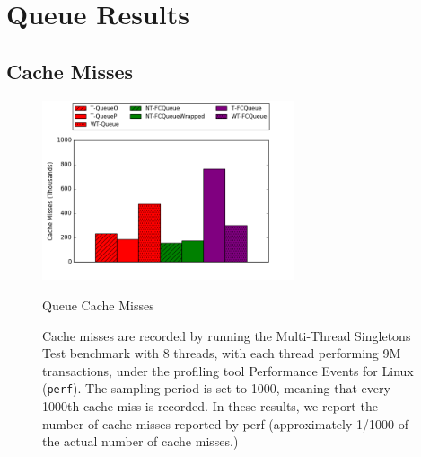 \chapter{Queue Results}
\label{app:queues}

\vspace{-20pt}
\section{Cache Misses}
\begin{figure}[H]
    \centering
    \includegraphics[width=0.66\textwidth]{fcqueues/cm.png}
    \caption{Queue Cache Misses}
    \caption*{
Cache misses are recorded by running the Multi-Thread Singletons Test benchmark with 8 threads, with each thread performing 9M transactions, under the profiling tool Performance Events for Linux (\texttt{perf}). The sampling period is set to 1000, meaning that every 1000th cache miss is recorded.
    In these results, we report the number of cache misses reported by perf (approximately 1/1000 of the actual number of cache misses.)}
\label{fig:qcm}
\end{figure}

